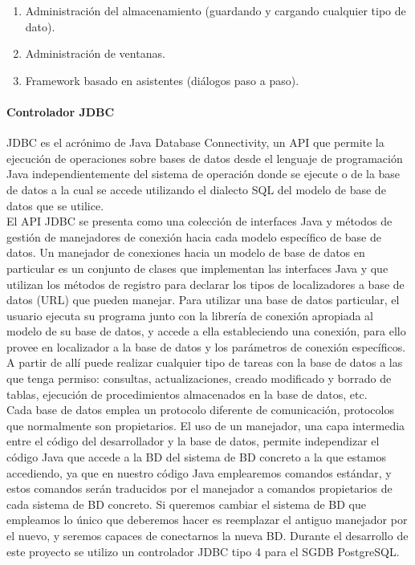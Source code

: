 \begin{description}
\begin{enumerate}
 \item Administraci\'on del almacenamiento (guardando y cargando cualquier tipo de dato).

 \item Administraci\'on de ventanas.

 \item Framework basado en asistentes (di\'alogos paso a paso).
\end{enumerate}

\paragraph{Controlador JDBC}
JDBC es el acr\'onimo de Java Database Connectivity, un API que permite la ejecuci\'on de operaciones sobre bases de datos desde el lenguaje de programaci\'on Java independientemente del sistema de operaci\'on donde se ejecute o de la base de datos a la cual se accede utilizando el dialecto SQL del modelo de base de datos que se utilice.\\

El API JDBC se presenta como una colecci\'on de interfaces Java y m\'etodos de gesti\'on de manejadores de conexi\'on hacia cada modelo espec\'ifico de base de datos. Un manejador de conexiones hacia un modelo de base de datos en particular es un conjunto de clases que implementan las interfaces Java y que utilizan los m\'etodos de registro para declarar los tipos de localizadores a base de datos (URL) que pueden manejar.  Para utilizar una base de datos particular, el usuario ejecuta su programa junto con la librer\'ia de conexi\'on apropiada al modelo de su base de datos, y accede a ella estableciendo una conexi\'on, para ello provee en localizador a la base de datos y los par\'ametros de conexi\'on espec\'ificos.  A partir de all\'i puede realizar cualquier tipo de tareas con la base de datos a las que tenga permiso: consultas, actualizaciones, creado modificado y borrado de tablas, ejecuci\'on de procedimientos almacenados en la base de datos, etc.\\

Cada base de datos emplea un protocolo diferente de comunicaci\'on, protocolos que normalmente son propietarios. El uso de un manejador, una capa intermedia entre el c\'odigo del desarrollador y la base de datos, permite independizar el c\'odigo Java que accede a la BD del sistema de BD concreto a la que estamos accediendo, ya que en nuestro c\'odigo Java emplearemos comandos est\'andar, y estos comandos ser\'an traducidos por el manejador a comandos propietarios de cada sistema de BD concreto.  Si queremos cambiar el sistema de BD que empleamos lo \'unico que deberemos hacer es reemplazar el antiguo manejador por el nuevo, y seremos capaces de conectarnos la nueva BD.  Durante el desarrollo de este proyecto se utilizo un controlador JDBC tipo 4 para el SGDB PostgreSQL.


\end{description}
